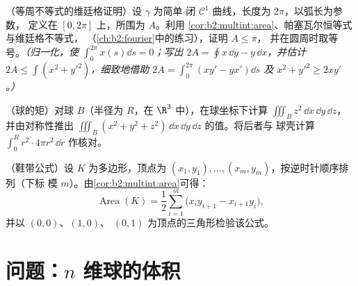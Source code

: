 \begin{exercise}[$\star\star\star$]\label{exo:b2:multint:10}
（等周不等式的维廷格证明）设 $\gamma$ 为简单
闭 $\mathcal{C}^1$ 曲线，长度为 $2\pi$，以弧长为参数，
定义在 $[0, 2\pi]$ 上，所围为 $A$。利用
\cref{cor:b2:multint:area}、帕塞瓦尔恒等式与维廷格不等式，
（\cref{ch:b2:fourier}中的练习），证明 $A \leq \pi$，
并在圆周时取等号。\emph{（归一化，使 $\int_0^{2\pi} x(s)\dd s
= 0$；写出 $2A = \oint x\,\dd y - y\,\dd x$，并估计 $2A \leq
\int (x^2 + y'^2)$，细致地借助 $2A = \int_0^{2\pi}(xy' - yx')\dd
s$ 及 $x^2 + y'^2 \geq 2xy'$。）}
\end{exercise}

\begin{exercise}[$\star\star$]\label{exo:b2:multint:11}
（球的矩）对球 $B$（半径为 $R$，在
$\R^3$ 中），在球坐标下计算 $\iiint_B z^2\,\dd x\,\dd y\,\dd z$，
并由对称性推出 $\iiint_B (x^2 + y^2 +
z^2)\,\dd x\,\dd y\,\dd z$ 的值。将后者与
球壳计算 $\int_0^R r^2\cdot4\pi
r^2\,\dd r$ 作核对。
\end{exercise}

\begin{exercise}[$\star\star$]\label{exo:b2:multint:12}
（鞋带公式）设 $K$ 为多边形，顶点为 $(x_1,
y_1), \dots, (x_m, y_m)$，按逆时针顺序排列（下标
模 $m$）。由\cref{cor:b2:multint:area}可得：
\[
\operatorname{Area}(K)
= \frac12\sum_{i=1}^m
\bigl(x_iy_{i+1} - x_{i+1}y_i\bigr) ,
\]
并以 $(0,0)$、$(1,0)$、
$(0,1)$ 为顶点的三角形检验该公式。
\end{exercise}

\section{问题：$n$ 维球的体积}

